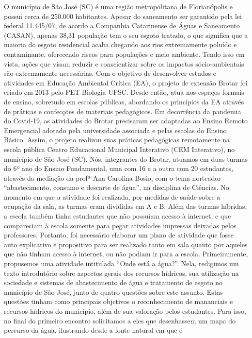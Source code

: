 O município de São José (SC) é uma região metropolitana de Florianópolis e possui
cerca de 250.000 habitantes. Apesar do saneamento ser garantido pela lei federal 11.445/07,
de acordo a Companhia Catarinense de Águas e Saneamento (CASAN), apenas 38,31%
população tem o seu esgoto tratado, o que significa que a maioria do esgoto residencial acaba
chegando aos rios extremamente poluído e contaminante, oferecendo riscos para populações e
meio ambiente. Tendo isso em vista, ações que visam reduzir e conscientizar sobre os
impactos sócio-ambientais são extremamente necessárias.
Com o objetivo de desenvolver estudos e atividades em Educação Ambiental Crítica
(EA), o projeto de extensão Brotar foi criado em 2013 pelo PET Biologia UFSC. Desde
então, atua nos espaços formais de ensino, sobretudo em escolas públicas, abordando os
princípios da EA através de práticas e confecções de materiais pedagógicos. Em decorrência
da pandemia do Covid-19, as atividades do Brotar precisaram ser adaptadas ao Ensino
Remoto Emergencial adotado pela universidade associada e pelas escolas do Ensino Básico.
Assim, o projeto realizou suas práticas pedagógicas remotamente na escola pública
Centro Educacional Municipal Interativo (CEM Interativo), no município de São José (SC).
Nós, integrantes do Brotar, atuamos em duas turmas do 6º ano do Ensino Fundamental, uma
com 16 e a outra com 20 estudantes, através da mediação da profª Ana Carolina Bosio, com
o tema norteador “abastecimento, consumo e descarte de água”, na disciplina de Ciências.
No momento em que a atividade foi realizada, por medidas de saúde sobre a ocupação
da sala, as turmas eram divididas em A e B. Além das turmas híbridas, a escola também tinha
estudantes que não possuíam acesso à internet, e que compareciam à escola somente para
pegar atividades impressas deixadas pelos professores. Portanto, foi necessário elaborar um
plano de atividade que fosse auto explicativo e propositivo para ser realizado tanto em sala
quanto por aqueles que não tinham acesso à internet, ou não podiam ir para a escola.
Primeiramente, propusemos uma atividade intitulada “Onde está a água?”. Nela,
redigimos um texto introdutório sobre aspectos gerais dos recursos hídricos, sua utilização na
sociedade e sistemas de abastecimento de água e tratamento de esgoto no município de São
José, junto de quatro questões sobre este assunto. Estas questões tinham como principais
objetivos o reconhecimento de mananciais e recursos hídricos do município, além de sua
valoração pelos estudantes. Para isso, no final do primeiro encontro solicitamos a eles que
desenhassem um mapa do percurso da água, ilustrando desde a fonte natural em que é
